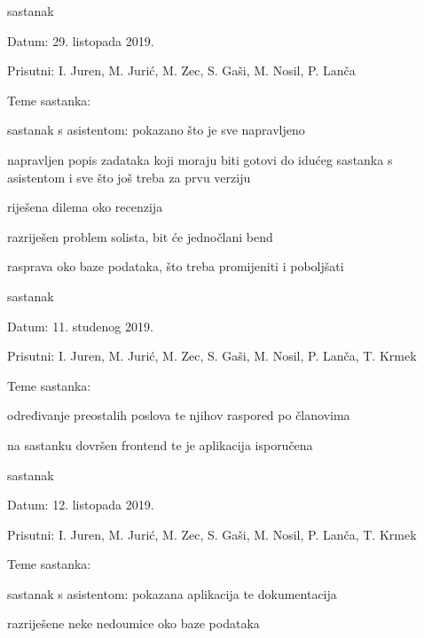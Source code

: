 \begin{packed_enum}
			\item  sastanak
			\item[] \begin{packed_item}
				\item Datum: 29. listopada 2019.
				\item Prisutni: I. Juren, M. Jurić, M. Zec, S. Gaši, M. Nosil, P. Lanča
				\item Teme sastanka:
				\begin{packed_item}
					\item  sastanak s asistentom: pokazano što je sve napravljeno
					\item  napravljen popis zadataka koji moraju biti gotovi do idućeg sastanka s asistentom i sve što još treba za prvu verziju
					\item  riješena dilema oko recenzija
					\item  razriješen problem solista, bit će jednočlani bend
					\item  rasprava oko baze podataka, što treba promijeniti i poboljšati
				\end{packed_item}
			\end{packed_item}
			
			\item  sastanak
			\item[] \begin{packed_item}
				\item Datum: 11. studenog 2019.
				\item Prisutni: I. Juren, M. Jurić, M. Zec, S. Gaši, M. Nosil, P. Lanča, T. Krmek
				\item Teme sastanka:
				\begin{packed_item}
					\item  određivanje preostalih poslova te njihov raspored po članovima
					\item  na sastanku dovršen frontend te je aplikacija isporučena
				\end{packed_item}
			\end{packed_item}
			
			\item  sastanak
			\item[] \begin{packed_item}
				\item Datum: 12. listopada 2019.
				\item Prisutni: I. Juren, M. Jurić, M. Zec, S. Gaši, M. Nosil, P. Lanča, T. Krmek
				\item Teme sastanka:
				\begin{packed_item}
					\item  sastanak s asistentom: pokazana aplikacija te dokumentacija
					\item  razriješene neke nedoumice oko baze podataka
				\end{packed_item}
			\end{packed_item}
			

\end{packed_enum}
